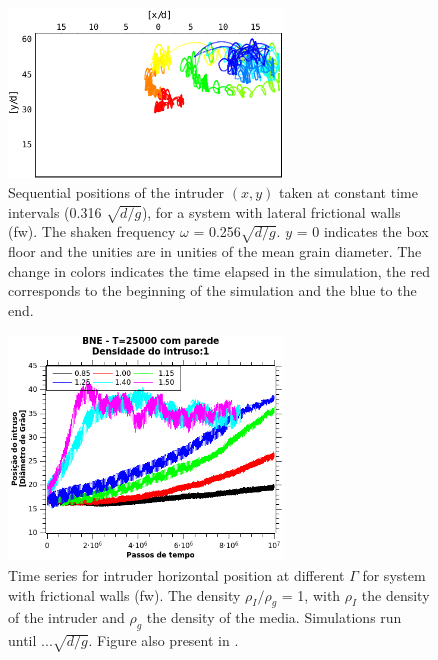\begin{figure}
    \centering
    \includegraphics[width=0.65\textwidth]{04-figuras/BNE_PositionWalls.pdf}
    \caption[BNE with walls: sample of intruder positions.]{Sequential positions of the intruder $(x, y)$ taken at constant time intervals (0.316 $\sqrt{d/g}$), for a system with lateral frictional walls (fw). The shaken frequency $\omega$ = 0.256$\sqrt{d/g}$. $y$ = 0 indicates the box floor and the unities are in unities of the mean grain diameter. The change in colors indicates the time elapsed in the simulation, the red corresponds to the beginning of the simulation and the blue to the end.}
    \label{fig:BNE_intruderwalls}
\end{figure}

\begin{figure}
    \centering
    \includegraphics[width=0.65\textwidth]{04-figuras/BNE25000D1.png}
    \caption[BNE with frictional walls: $\rho_I/\rho_g$ = 1.]{Time series for intruder horizontal position at different $\Gamma$ for system with frictional walls (fw). The density $\rho_I/\rho_g$ = 1, with $\rho_I$ the density of the intruder and $\rho_g$ the density of the media. Simulations run until $...\sqrt{d/g}$. Figure also present in \cite{Large-deviation_quantification_of_boundary_conditions_on_the_Brazil_nut_effect}.}
    \label{fig:BNE25000_Parede}
\end{figure}

